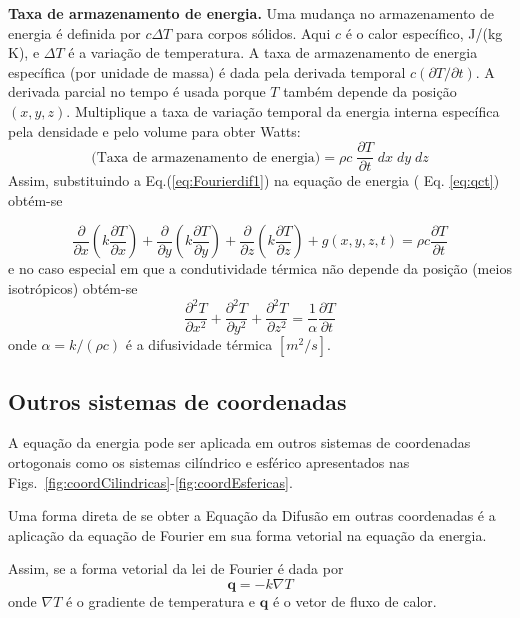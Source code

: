 \textbf{Taxa de armazenamento de energia.} Uma mudança no armazenamento de energia é definida por $c \Delta T$ para corpos sólidos. Aqui $c$ é o calor específico, J/(kg K), e $\Delta T$ é a variação de temperatura. A taxa de armazenamento de energia específica (por unidade de massa) é dada pela derivada temporal $c(\partial T / \partial t)$. A derivada parcial no tempo é usada porque $T$ também depende da posição $(x,y,z)$. Multiplique a taxa de variação temporal da energia interna específica pela densidade e pelo volume para obter Watts: 
\begin{equation}\label{eq:qct1}	
	\text{(Taxa de armazenamento de energia)} = \rho c \; \frac{ \partial T} {\partial t} \;dx \;dy \;dz
\end{equation}
Assim, substituindo a Eq.(\ref{eq:Fourierdif1}) na equação de energia ( Eq. \ref{eq:qct}) obtém-se 

\begin{equation}\label{eq3Da}
	\frac{\partial}{\partial x} \left(k\frac{\partial T}{\partial x}\right) + 
	\frac{\partial}{\partial y} \left(k\frac{\partial T}{\partial y}\right) + 
	\frac{\partial}{\partial z} \left(k\frac{\partial T}{\partial z}\right) + 
	g(x,y,z,t) = \rho c \frac{\partial T}{\partial t}  
\end{equation}	
e no caso especial em que a condutividade térmica não depende da posição (meios isotrópicos) obtém-se
\begin{equation}\label{eq3Db}
	\frac{\partial^2 T}{\partial x^2} +
	\frac{\partial^2 T}{\partial y^2} + 
	\frac{\partial^2 T}{\partial z^2} = 
	\frac{1}{\alpha} \frac{\partial T}{\partial t}  
\end{equation}
onde $\alpha = k/(\rho c)$ é a difusividade térmica $[m^2/s]$.

\subsection{Outros sistemas de coordenadas}

A equação da energia pode ser aplicada em outros sistemas de coordenadas ortogonais como  os sistemas cilíndrico e esférico apresentados nas Figs.~\ref{fig:coordCilindricas}-\ref{fig:coordEsfericas}.

Uma forma direta de se obter a Equação da Difusão em outras coordenadas é a aplicação da equação de Fourier em sua forma vetorial na equação da energia.

Assim, se a forma vetorial da lei de Fourier é dada por
\begin{equation}\label{eq:Fourier0}
	\mathbf{q} = - k \nabla T  
\end{equation}
onde $\nabla T$ é o gradiente de temperatura e $\mathbf{q}$ é o vetor de fluxo de calor.

